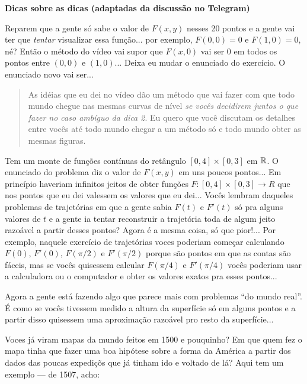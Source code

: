 \documentclass[oneside,12pt]{article}
\begin{document}
\newpage

{\bf Dicas sobre as dicas (adaptadas da discussão no Telegram)}

Reparem que a gente só sabe o valor de $F(x,y)$ nesses 20 pontos e a
gente vai ter que {\sl tentar} visualizar essa função... por exemplo,
$F(0,0)=0$ e $F(1,0)=0$, né? Então o método do vídeo vai supor que
$F(x,0)$ vai ser 0 em todos os pontos entre $(0,0)$ e $(1,0)$... Deixa
eu mudar o enunciado do exercício. O enunciado novo vai ser...



\begin{quote}

  As idéias que eu dei no vídeo dão um método que vai fazer com que
  todo mundo chegue nas mesmas curvas de nível {\sl se vocês decidirem
    juntos o que fazer no caso ambíguo da dica 2}. Eu quero que você
  discutam os detalhes entre vocês até todo mundo chegar a um método
  só e todo mundo obter as mesmas figuras.

\end{quote}

Tem um monte de funções contínuas do retângulo $[0,4]×[0,3]$ em $\mathbb{R}$.
O enunciado do problema diz o valor de $F(x,y)$ em uns poucos
pontos... Em princípio haveriam infinitos jeitos de obter funções $F:
[0,4]×[0,3] → R$ que nos pontos que eu dei valessem os valores que eu
dei... Vocês lembram daqueles problemas de trajetórias em que a gente
sabia $F(t)$ e $F'(t)$ só pra alguns valores de $t$ e a gente ia
tentar reconstruir a trajetória toda de algum jeito razoável a partir
desses pontos? Agora é a mesma coisa, só que pior!... Por exemplo,
naquele exercício de trajetórias voces poderiam começar calculando
$F(0)$, $F'(0)$, $F(\pi/2)$ e $F'(\pi/2)$ porque são pontos em que as
contas são fáceis, mas se vocês quisessem calcular $F(\pi/4)$ e
$F'(\pi/4)$ vocês poderiam usar a calculadora ou o computador e obter
os valores exatos pra esses pontos...

Agora a gente está fazendo algo que parece mais com problemas ``do
mundo real''. É como se vocês tivessem medido a altura da superfície
só em alguns pontos e a partir disso quisessem uma aproximação
razoável pro resto da superfície...

Voces já viram mapas da mundo feitos em 1500 e pouquinho? Em que quem
fez o mapa tinha que fazer uma boa hipótese sobre a forma da América a
partir dos dados das poucas expediçõs que já tinham ido e voltado de
lá? Aqui tem um exemplo --- de 1507, acho:
\end{document}
